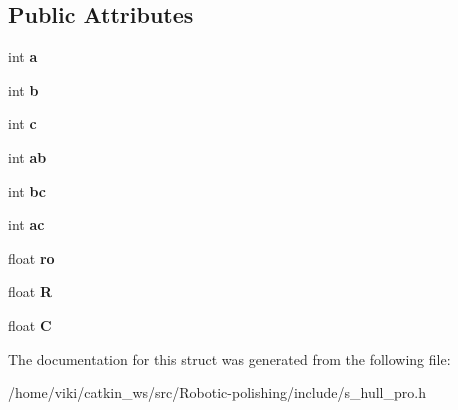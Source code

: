 \subsection*{Public Attributes}
\begin{DoxyCompactItemize}
\item 
int {\bfseries a}\hypertarget{structTriad_aed837fece57302be8ddfc8e9a214940e}{}\label{structTriad_aed837fece57302be8ddfc8e9a214940e}

\item 
int {\bfseries b}\hypertarget{structTriad_ad7e8ea49b350f66d169a43ef43bf7690}{}\label{structTriad_ad7e8ea49b350f66d169a43ef43bf7690}

\item 
int {\bfseries c}\hypertarget{structTriad_a58db8e86981d7bf92d205579096ead94}{}\label{structTriad_a58db8e86981d7bf92d205579096ead94}

\item 
int {\bfseries ab}\hypertarget{structTriad_ad00e14aefedbb149222e8405c1ca842d}{}\label{structTriad_ad00e14aefedbb149222e8405c1ca842d}

\item 
int {\bfseries bc}\hypertarget{structTriad_ada41dc3fc7e671f4e9d2cc36b338e952}{}\label{structTriad_ada41dc3fc7e671f4e9d2cc36b338e952}

\item 
int {\bfseries ac}\hypertarget{structTriad_a928ab856e1a35d185529dac88bfb6b13}{}\label{structTriad_a928ab856e1a35d185529dac88bfb6b13}

\item 
float {\bfseries ro}\hypertarget{structTriad_aaebe6e80cf0ab07f99954a9c85dd0dc8}{}\label{structTriad_aaebe6e80cf0ab07f99954a9c85dd0dc8}

\item 
float {\bfseries R}\hypertarget{structTriad_adab57fdd054d3fbbc8d3bb162d61cc21}{}\label{structTriad_adab57fdd054d3fbbc8d3bb162d61cc21}

\item 
float {\bfseries C}\hypertarget{structTriad_a263a360fb142f3aca59f7c62f5c24d70}{}\label{structTriad_a263a360fb142f3aca59f7c62f5c24d70}

\end{DoxyCompactItemize}


The documentation for this struct was generated from the following file\+:\begin{DoxyCompactItemize}
\item 
/home/viki/catkin\+\_\+ws/src/\+Robotic-\/polishing/include/s\+\_\+hull\+\_\+pro.\+h\end{DoxyCompactItemize}
